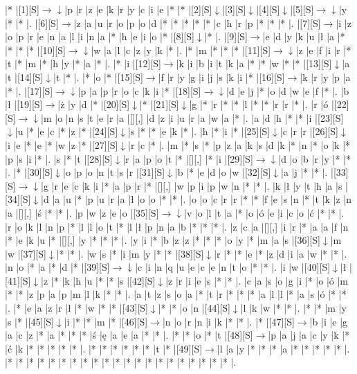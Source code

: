 \documentclass[11pt]{article}
\newcommand\drarr{$\rightarrow \!\!\!\!\! \downarrow$}
\newcommand\rarr{$\rightarrow$}
\newcommand\darr{$\downarrow$}
\begin{document}
\noindent\begin{Puzzle}{20}{32}|*	|[1][S]\drarr	|p	|r	|z	|e	|k	|r	|y	|c	|i	|e	|*	|*	|[2][S]\darr	|[3][S]\darr	|[4][S]\darr	|[5][S]\drarr	|y	|*	|*	|.
|[6][S]\rarr	|z	|a	|u	|r	|o	|p	|o	|d	|*	|*	|*	|*	|*	|c	|h	|r	|p	|*	|*	|*	|.
|[7][S]\rarr	|i	|z	|o	|p	|r	|e	|n	|a	|l	|i	|n	|a	|*	|h	|e	|i	|o	|*	|[8][S]\darr	|*	|.
|[9][S]\rarr	|e	|d	|y	|k	|u	|ł	|a	|*	|*	|*	|*	|[10][S]\drarr	|w	|a	|l	|c	|z	|y	|k	|*	|.
|*	|m	|*	|*	|*	|[11][S]\drarr	|z	|e	|f	|i	|r	|*	|t	|*	|m	|*	|h	|y	|*	|a	|*	|.
|*	|i	|[12][S]\rarr	|k	|i	|b	|i	|t	|k	|a	|*	|*	|w	|*	|*	|[13][S]\darr	|a	|t	|[14][S]\darr	|t	|*	|.
|*	|o	|*	|[15][S]\rarr	|f	|r	|y	|g	|i	|j	|s	|k	|i	|*	|[16][S]\rarr	|k	|r	|y	|p	|a	|*	|.
|[17][S]\drarr	|p	|a	|p	|r	|o	|c	|k	|i	|*	|[18][S]\drarr	|d	|e	|j	|*	|o	|d	|w	|e	|f	|*	|.
|b	|ł	|[19][S]\rarr	|ż	|y	|d	|*	|[20][S]\darr	|*	|[21][S]\darr	|g	|*	|r	|*	|*	|l	|*	|*	|r	|r	|*	|.
|r	|ó	|[22][S]\drarr	|m	|o	|n	|s	|t	|e	|r	|a	|[][,]{ }	|d	|z	|i	|u	|r	|a	|w	|a	|*	|.
|a	|d	|h	|*	|*	|i	|[23][S]\darr	|u	|*	|e	|c	|*	|z	|*	|[24][S]\darr	|s	|*	|*	|e	|k	|*	|.
|h	|*	|i	|*	|[25][S]\darr	|c	|r	|r	|[26][S]\darr	|i	|e	|*	|e	|*	|w	|z	|*	|[27][S]\darr	|r	|c	|*	|.
|m	|*	|s	|*	|p	|z	|a	|k	|s	|d	|k	|*	|n	|*	|o	|k	|*	|p	|s	|i	|*	|.
|s	|*	|t	|[28][S]\darr	|r	|a	|p	|o	|t	|*	|[][,]{ }	|*	|i	|[29][S]\drarr	|d	|o	|b	|r	|y	|*	|*	|.
|*	|[30][S]\darr	|o	|p	|o	|n	|t	|s	|r	|[31][S]\darr	|b	|*	|e	|d	|o	|w	|[32][S]\darr	|a	|j	|*	|*	|.
|[33][S]\drarr	|g	|r	|e	|c	|k	|i	|*	|a	|p	|r	|*	|[][,]{ }	|w	|p	|i	|p	|w	|n	|*	|*	|.
|k	|ł	|y	|t	|h	|a	|s	|[34][S]\darr	|d	|a	|u	|*	|p	|u	|r	|a	|ł	|o	|o	|*	|*	|.
|o	|o	|c	|r	|r	|*	|*	|f	|e	|s	|n	|*	|t	|k	|z	|n	|a	|[][,]{ }	|ś	|*	|*	|.
|p	|w	|z	|e	|o	|[35][S]\drarr	|v	|o	|l	|t	|a	|*	|o	|ó	|e	|i	|c	|o	|ć	|*	|*	|.
|r	|o	|k	|l	|n	|p	|*	|l	|l	|o	|t	|*	|l	|ł	|p	|n	|a	|b	|*	|*	|*	|.
|z	|c	|a	|[][,]{ }	|i	|r	|*	|a	|a	|f	|n	|*	|e	|k	|u	|*	|[][,]{ }	|y	|*	|*	|*	|.
|y	|i	|*	|b	|z	|z	|*	|*	|*	|o	|y	|*	|m	|a	|s	|[36][S]\darr	|m	|w	|[37][S]\darr	|*	|*	|.
|w	|s	|*	|i	|m	|y	|*	|*	|[38][S]\darr	|r	|*	|*	|e	|*	|z	|d	|i	|a	|w	|*	|*	|.
|n	|o	|*	|a	|*	|d	|*	|[39][S]\drarr	|c	|i	|n	|q	|u	|e	|c	|e	|n	|t	|o	|*	|*	|.
|i	|w	|[40][S]\darr	|ł	|[41][S]\darr	|z	|*	|k	|h	|u	|*	|*	|s	|[42][S]\darr	|z	|r	|i	|e	|s	|*	|*	|.
|c	|a	|s	|o	|g	|i	|*	|o	|ó	|m	|*	|*	|z	|p	|a	|p	|m	|l	|k	|*	|*	|.
|a	|t	|z	|s	|o	|a	|*	|t	|r	|*	|*	|*	|a	|l	|l	|*	|a	|s	|ó	|*	|*	|.
|*	|e	|a	|z	|r	|ł	|*	|w	|*	|*	|[43][S]\darr	|*	|*	|o	|n	|[44][S]\darr	|l	|k	|w	|*	|*	|.
|*	|*	|m	|y	|s	|*	|[45][S]\darr	|i	|*	|*	|m	|*	|[46][S]\rarr	|n	|o	|r	|n	|i	|k	|*	|*	|.
|*	|[47][S]\rarr	|b	|i	|e	|g	|a	|c	|z	|*	|a	|*	|*	|*	|ś	|ę	|a	|e	|a	|*	|*	|.
|*	|*	|o	|*	|t	|[48][S]\rarr	|p	|a	|j	|a	|c	|y	|k	|*	|ć	|k	|*	|*	|*	|*	|*	|.
|*	|*	|*	|*	|*	|*	|t	|*	|[49][S]\rarr	|l	|a	|y	|*	|*	|*	|a	|*	|*	|*	|*	|*	|.
|*	|*	|*	|*	|*	|*	|*	|*	|*	|*	|*	|*	|*	|*	|*	|*	|*	|*	|*	|*	|*	|.\end{Puzzle}
\end{document}
